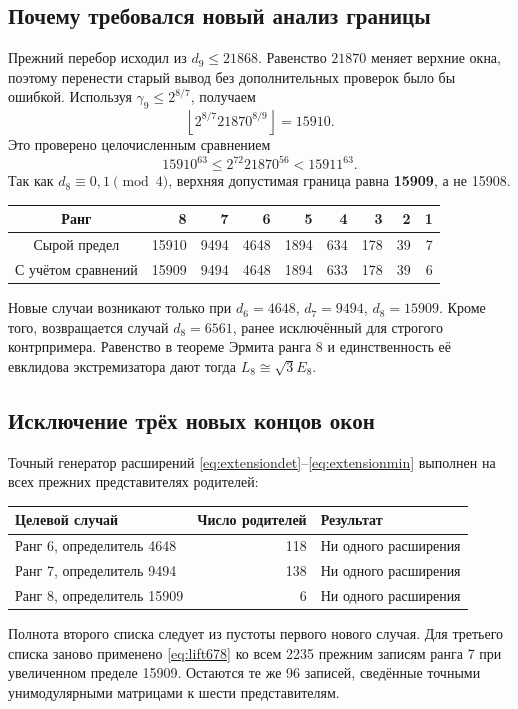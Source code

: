 \documentclass[11pt,a4paper]{article}
\theoremstyle{remark}\newtheorem{remark}[theorem]{Замечание}
\begin{document}
\subsection{Почему требовался новый анализ границы}

Прежний перебор исходил из $d_9\le21868$. Равенство $21870$ меняет верхние окна, поэтому перенести старый вывод без дополнительных проверок было бы ошибкой. Используя $\gamma_9\le2^{8/7}$, получаем
\[
\left\lfloor2^{8/7}21870^{8/9}\right\rfloor=15910.
\]
Это проверено целочисленным сравнением
\[
15910^{63}\le2^{72}21870^{56}<15911^{63}.
\]
Так как $d_8\equiv0,1\pmod4$, верхняя допустимая граница равна \textbf{15909}, а не 15908.

\begin{center}
\begin{tabular}{c*{8}{r}}
\toprule
Ранг &8&7&6&5&4&3&2&1\\\midrule
Сырой предел &15910&9494&4648&1894&634&178&39&7\\
С учётом сравнений &15909&9494&4648&1894&633&178&39&6\\
\bottomrule
\end{tabular}
\end{center}

Новые случаи возникают только при $d_6=4648$, $d_7=9494$, $d_8=15909$. Кроме того, возвращается случай $d_8=6561$, ранее исключённый для строгого контрпримера. Равенство в теореме Эрмита ранга 8 и единственность её евклидова экстремизатора дают тогда $L_8\cong\sqrt3E_8$.

\subsection{Исключение трёх новых концов окон}

Точный генератор расширений \eqref{eq:extensiondet}--\eqref{eq:extensionmin} выполнен на всех прежних представителях родителей:
\begin{center}
\begin{tabular}{lrl}
\toprule
Целевой случай & Число родителей & Результат\\\midrule
Ранг 6, определитель 4648 &118&Ни одного расширения\\
Ранг 7, определитель 9494 &138&Ни одного расширения\\
Ранг 8, определитель 15909 &6&Ни одного расширения\\
\bottomrule
\end{tabular}
\end{center}
Полнота второго списка следует из пустоты первого нового случая. Для третьего списка заново применено \eqref{eq:lift678} ко всем 2235 прежним записям ранга 7 при увеличенном пределе 15909. Остаются те же 96 записей, сведённые точными унимодулярными матрицами к шести представителям.
\end{document}
